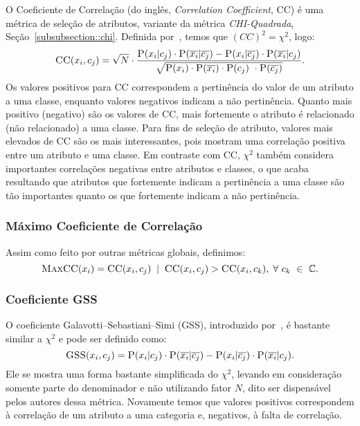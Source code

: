 O Coeficiente de Correlação (do inglês, \textit{Correlation Coefficient}, \textsc{CC}) é uma métrica de seleção de atributos, variante da métrica \textit{CHI-Quadrada}, Seção~\ref{subsubsection::chi}. Definida por~\cite{Ng97}, temos que $(CC)^2 = \chi^2$, logo:
\begin{equation}\label{eqn::ce}
   \textsc{CC}(x_i, c_j) = \sqrt{N} \cdot \frac{ \textsc{P}(x_i|c_j) \cdot \textsc{P}(\overline{x_i}|\overline{c_j}) - \textsc{P}(x_i|\overline{c_j}) \cdot \textsc{P}(\overline{x_i}|c_j) } {\sqrt{ \textsc{P}(x_i) \cdot \textsc{P}(\overline{x_i}) \cdot \textsc{P}(c_j) \ \cdot \textsc{P}(\overline{c_j}) } }.
\end{equation}
Os valores positivos para CC correspondem a pertinência do valor de um atributo a uma classe, enquanto valores negativos indicam a não pertinência. Quanto mais positivo (negativo) são os valores de CC, mais fortemente o atributo é relacionado (não relacionado) a uma classe. Para fins de seleção de atributo, valores mais elevados de CC são os mais interessantes, pois mostram uma correlação positiva entre um atributo e uma classe. Em contraste com CC, $\chi^2$ também considera importantes correlações negativas entre atributos e classes, o que acaba resultando que atributos que fortemente indicam a pertinência a uma classe são tão importantes quanto os que fortemente indicam a não pertinência.

\subsubsection{Máximo Coeficiente de Correlação}
\label{subsubsection::maxcc}

Assim como feito por outras métricas globais, definimos:
\begin{equation}\label{eqn::maxcc}
\textsc{MaxCC}(x_i) = \textsc{CC}(x_i,c_j) \; \; | \;\; \textsc{CC}(x_i, c_j) > \textsc{CC}(x_i, c_k), \; \forall\ c_k\ \in\ \mathbb{C}.
\end{equation}



\subsubsection{Coeficiente GSS}
\label{subsubsection::gss}
O coeficiente Galavotti–Sebastiani–Simi (GSS), introduzido por~\cite{Galavotti00}, é bastante similar a $\chi^2$ e pode ser definido como:
\begin{equation}\label{eqn::gss}
   \textsc{GSS}(x_i, c_j) = \textsc{P}(x_i|c_j) \cdot \textsc{P}(\overline{x_i}|\overline{c_j}) - \textsc{P}(x_i|\overline{c_j}) \cdot \textsc{P}(\overline{x_i}|c_j).
\end{equation}
Ele se mostra uma forma bastante simplificada do $\chi^2$, levando em consideração somente parte do denominador e não utilizando fator $N$, dito ser dispensável pelos autores dessa métrica. Novamente temos que valores positivos correspondem à correlação de um atributo a uma categoria e, negativos, à falta de correlação. 

